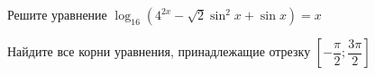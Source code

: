 \begin{ex}
	\begin{condition}
		\begin{enumcols}[label=\asbuk*)]
			\item Решите уравнение \( \log_{16} (4^{2x} -\sqrt{2}\sin^2 x + \sin x ) = x \)
			\item Найдите все корни уравнения, принадлежащие отрезку \( \left[-\dfrac{\pi}{2};\dfrac{3\pi}{2}\right] \)
		\end{enumcols}
	\end{condition}
\end{ex}